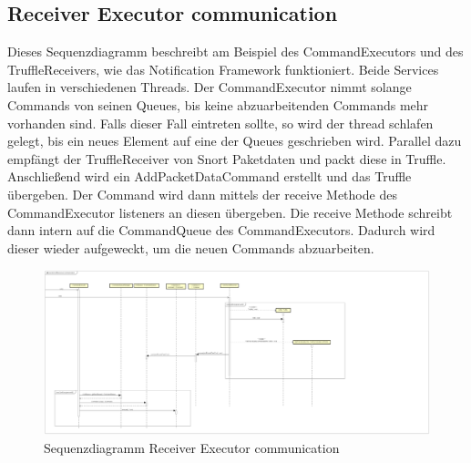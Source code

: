 \subsection{Receiver Executor communication}

Dieses Sequenzdiagramm beschreibt am Beispiel des CommandExecutors und des TruffleReceivers, wie das Notification Framework funktioniert.
Beide Services laufen in verschiedenen Threads. Der CommandExecutor nimmt solange Commands von seinen Queues, bis keine abzuarbeitenden
Commands mehr vorhanden sind. Falls dieser Fall eintreten sollte, so wird der thread schlafen gelegt, bis ein neues Element auf eine
der Queues geschrieben wird. Parallel dazu empfängt der TruffleReceiver von Snort Paketdaten und packt diese in Truffle. Anschließend
wird ein AddPacketDataCommand erstellt und das Truffle übergeben. Der Command wird dann mittels der receive Methode des CommandExecutor listeners
an diesen übergeben. Die receive Methode schreibt dann intern auf die CommandQueue des CommandExecutors. Dadurch wird dieser wieder aufgeweckt,
um die neuen Commands abzuarbeiten.

\FloatBarrier
\begin{figure}
  \centering
  \includegraphics[width=\textwidth]{../diagramimages/sd_receiver_executor_comm.png}
  \caption[Sequenzdiagramm Receiver Executor communication]{Sequenzdiagramm Receiver Executor communication}
\end{figure} \FloatBarrier 